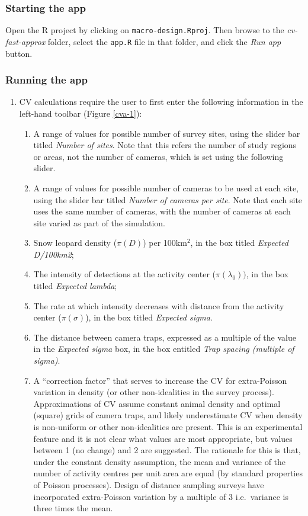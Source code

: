 \documentclass[a4paper,11pt, draft]{article} %
\begin{document}
\subsubsection{Starting the app}
Open the R project by clicking on \texttt{macro-design.Rproj}. Then browse to the \textit{cv-fast-approx} folder, select the \texttt{app.R} file in that folder, and click the \textit{Run app} button. 

\subsubsection{Running the app}

\begin{enumerate}
\item CV calculations require the user to first enter the following information in the left-hand toolbar (Figure \ref{cva-1}):
\begin{enumerate}
\item A range of values for possible number of survey sites, using the slider bar titled \textit{Number of sites}. Note that this refers the number of study regions or areas, not the number of cameras, which is set using the following slider.
\item A range of values for possible number of cameras to be used at each site, using the slider bar titled \textit{Number of cameras per site}. Note that each site uses the same number of cameras, with the number of cameras at each site varied as part of the simulation.
\item Snow leopard density ($\pi(D)$) per 100km$^2$, in the box titled \textit{Expected D/100km2};
\item The intensity of detections at the activity center ($\pi(\lambda_0))$, in the box titled \textit{Expected lambda};
\item The rate at which intensity decreases with distance from the activity center ($\pi(\sigma)$), in the box titled \textit{Expected sigma}. 
\item The distance between camera traps, expressed as a multiple of the value in the \textit{Expected sigma} box, in the box entitled \textit{Trap spacing (multiple of sigma)}.
\item A ``correction factor'' that serves to increase the CV for extra-Poisson variation in density (or other non-idealities in the survey process). Approximations of CV assume constant animal density and optimal (square) grids of camera traps, and likely underestimate CV when density is non-uniform or other non-idealities are present. This is an experimental feature and it is not clear what values are most appropriate, but values between 1 (no change) and 2 are suggested. The rationale for this is that, under the constant density assumption, the mean and variance of the number of activity centres per unit area are equal (by standard properties of Poisson processes). Design of distance sampling surveys have incorporated extra-Poisson variation by a multiple of 3 i.e.\ variance is three times the mean. 

\end{enumerate}
\end{enumerate}
\end{document}

